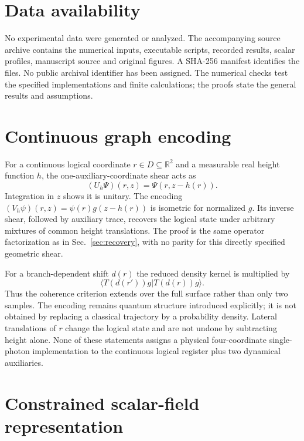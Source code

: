 \documentclass[aip,adv,reprint,onecolumn,amsmath,amssymb]{revtex4-2}
\begin{document}
\section*{Data availability}
No experimental data were generated or analyzed. The accompanying source archive contains the numerical inputs, executable scripts, recorded results, scalar profiles, manuscript source and original figures. A SHA-256 manifest identifies the files. No public archival identifier has been assigned. The numerical checks test the specified implementations and finite calculations; the proofs state the general results and assumptions.

\appendix
\section{Continuous graph encoding}
\label{app:continuous}
For a continuous logical coordinate $r\in D\subseteq\mathbb R^2$ and a measurable real height function $h$, the one-auxiliary-coordinate shear acts as
\begin{equation}
 (U_h\Psi)(r,z)=\Psi(r,z-h(r)).
 \label{eq:continuousU}
\end{equation}
Integration in $z$ shows it is unitary. The encoding $(V_h\psi)(r,z)=\psi(r)g(z-h(r))$ is isometric for normalized $g$. Its inverse shear, followed by auxiliary trace, recovers the logical state under arbitrary mixtures of common height translations. The proof is the same operator factorization as in Sec.~\ref{sec:recovery}, with no parity for this directly specified geometric shear.

For a branch-dependent shift $d(r)$ the reduced density kernel is multiplied by
\begin{equation}
 \langle T(d(r'))g|T(d(r))g\rangle.
\end{equation}
Thus the coherence criterion extends over the full surface rather than only two samples. The encoding remains quantum structure introduced explicitly; it is not obtained by replacing a classical trajectory by a probability density. Lateral translations of $r$ change the logical state and are not undone by subtracting height alone. None of these statements assigns a physical four-coordinate single-photon implementation to the continuous logical register plus two dynamical auxiliaries.

\section{Constrained scalar-field representation}\label{app:scalar}
\end{document}
